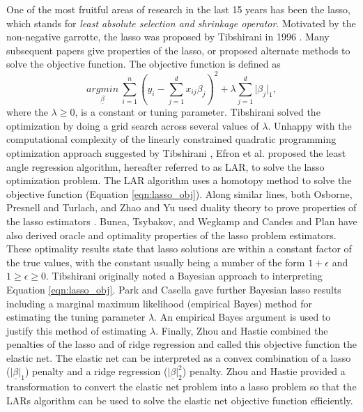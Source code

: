 One of the most fruitful areas of research in the last 15 years has been the lasso, which stands for \emph{least absolute selection and shrinkage operator}. Motivated by the non-negative garrotte, the lasso was proposed by Tibshirani in 1996 \cite{tibshirani1996regression}. Many subsequent papers give properties of the lasso, or proposed alternate methods to solve the objective function. The objective function is defined as
\begin{equation}\label{eqn:lasso_obj}
\underset{\underline{\beta}}{argmin}\ \sum_{i=1}^n(y_i - \sum_{j=1}^dx_{ij}\beta_j)^2 +\lambda\sum_{j=1}^d\vert \beta_j\vert_1,
\end{equation}
 where the $\lambda \geq 0$, is a constant or tuning parameter. Tibshirani solved the optimization by doing a grid search across several values of $\lambda$. Unhappy with the computational complexity of the linearly constrained quadratic programming optimization approach suggested by Tibshirani \cite{tibshirani1996regression}, Efron et al. \cite{efron2004least} proposed the least angle regression algorithm, hereafter referred to as LAR, to solve the lasso optimization problem. The LAR algorithm uses a homotopy method to solve the objective function (Equation \ref{eqn:lasso_obj}). Along similar lines, both Osborne, Presnell and Turlach, and Zhao and Yu used duality theory to prove properties of the lasso estimators \cite{osborne2000lasso,zhao2007model}. Bunea, Tsybakov, and Wegkamp  \cite{bunea2007sparsity} and Candes and Plan  \cite{candes2011tight} have also derived oracle and optimality properties of the lasso problem estimators. These optimality results state that lasso solutions are within a constant factor of the true values, with the constant usually being a number of the form $1+\epsilon$ and $1\geq\epsilon\geq 0$. Tibshirani \cite{tibshirani1996regression} originally noted a Bayesian approach to interpreting Equation \ref{eqn:lasso_obj}. Park and Casella  \cite{park2008bayesian} gave further Bayesian lasso results including a marginal maximum likelihood (empirical Bayes) method for estimating the tuning parameter $\lambda$. An empirical Bayes argument is used to justify this method of estimating $\lambda$. Finally, Zhou and Hastie \cite{zou2005regularization} combined the penalties of the lasso and of ridge regression and called this objective function the elastic net. The elastic net can be interpreted as a convex combination of a lasso ($\vert \underline{\beta}\vert_1$) penalty and a ridge regression ($\vert \underline{\beta}\vert_2^2$) penalty. Zhou and Hastie \cite{zou2005regularization} provided a transformation to convert the elastic net problem into a lasso problem so that the LARs algorithm can be used to solve the elastic net objective function efficiently.      
 
